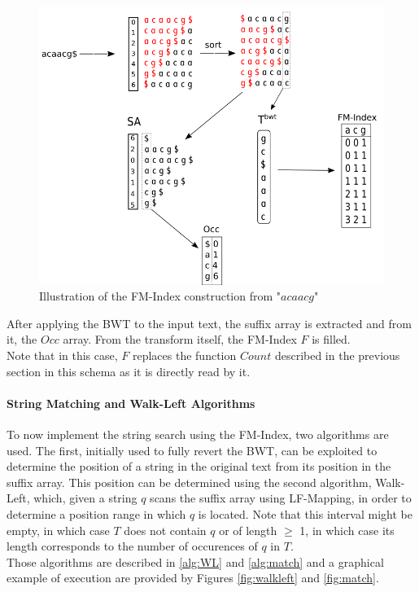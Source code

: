 \begin{minipage}{0.5\textwidth}
\begin{figure}[H]
    \hspace{-15mm}\includegraphics[scale = 0.35]{Figures/FMIndex.png}
    \caption{Illustration of the FM-Index construction from "$acaacg$"}
    \label{fig:fmindex}
\end{figure}
\end{minipage}
\hspace{15mm}
\begin{minipage}{0.3\textwidth}
After applying the BWT to the input text, the suffix array is extracted and from it, the $Occ$ array. From the transform itself, the FM-Index $F$ is filled. \\
Note that in this case, $F$ replaces the function $Count$ described in the previous section in this schema as it is directly read by it.
\end{minipage}


\paragraph{String Matching and Walk-Left Algorithms} To now implement the string search using the FM-Index, two algorithms are used. The first, initially used to fully revert the BWT, can be exploited to determine the position of a string in the original text from its position in the suffix array. This position can be determined using the second algorithm, Walk-Left, which, given a string $q$ scans the suffix array using LF-Mapping, in order to determine a position range in which $q$ is located. Note that this interval might be empty, in which case $T$ does not contain $q$ or of length $\geq$ 1, in which case its length corresponds to the number of occurences of $q$ in $T$. \\
Those algorithms are described in \ref{alg:WL} and \ref{alg:match} and a graphical example of execution are provided by Figures \ref{fig:walkleft} and \ref{fig:match}.

